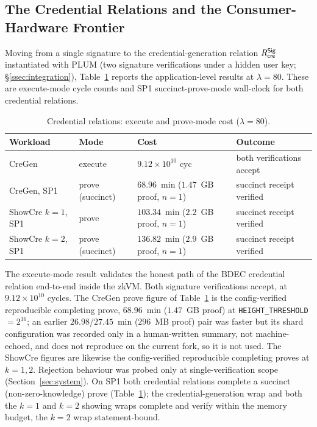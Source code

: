 \subsection{The Credential Relations and the Consumer-Hardware Frontier}\label{ssec:frontier}
Moving from a single signature to the credential-generation relation $R_{\mathsf{cre}}^{\mathsf{Sig}}$ instantiated with PLUM (two signature verifications under a hidden user key; \S\ref{ssec:integration}), Table~\ref{tab:bdec} reports the application-level results at $\lambda=80$. These are execute-mode cycle counts and SP1 succinct-prove-mode wall-clock for both credential relations.

\begin{table}[H]
\centering
\small
\begin{tabular}{l l p{3.2cm} p{4.6cm}}
\toprule
Workload & Mode & Cost & Outcome \\
\midrule
CreGen & execute & $9.12\times10^{10}$ cyc & both verifications accept \\ %
CreGen, SP1 & prove (succinct) & $68.96$~min ($1.47$~GB proof, $n{=}1$) & succinct receipt verified \\ %
ShowCre $k{=}1$, SP1 & prove & $103.34$~min ($2.2$~GB proof, $n{=}1$) & succinct receipt verified \\
ShowCre $k{=}2$, SP1 & prove (succinct) & $136.82$~min ($2.9$~GB proof, $n{=}1$) & succinct receipt verified \\
\bottomrule
\end{tabular}
\caption{Credential relations: execute and prove-mode cost ($\lambda=80$).}
\label{tab:bdec}
\end{table}

The execute-mode result validates the honest path of the BDEC credential relation end-to-end inside the zkVM. Both signature verifications accept, at $9.12\times10^{10}$ cycles. The CreGen prove figure of Table~\ref{tab:bdec} is the config-verified reproducible completing prove, $68.96$~min ($1.47$~GB proof) at \texttt{HEIGHT\_THRESHOLD}$=2^{16}$; an earlier $26.98$/$27.45$~min ($296$~MB proof) pair was faster but its shard configuration was recorded only in a human-written summary, not machine-echoed, and does not reproduce on the current fork, so it is not used. The ShowCre figures are likewise the config-verified reproducible completing proves at $k{=}1,2$. Rejection behaviour was probed only at single-verification scope (Section~\ref{sec:system}). On SP1 both credential relations complete a succinct (non-zero-knowledge) prove (Table~\ref{tab:bdec}); the credential-generation wrap and both the $k{=}1$ and $k{=}2$ showing wraps complete and verify within the memory budget, the $k{=}2$ wrap statement-bound.

